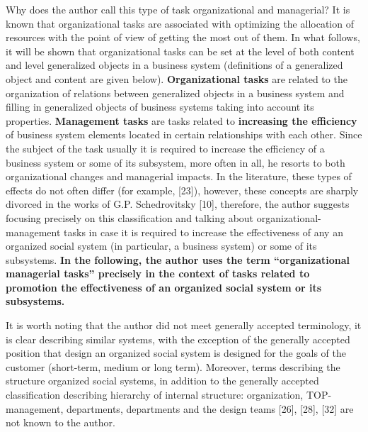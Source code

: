 Why does the author call this type of task organizational and managerial?  It
is known that organizational tasks are associated with optimizing the
allocation of resources with the point of view of getting the most out of
them. In what follows, it will be shown that organizational tasks can be set
at the level of both content and level generalized objects in a business
system (definitions of a generalized object and content are given below).
\textbf{Organizational tasks} are related to the organization of relations
between generalized objects in a business system and filling in generalized
objects of business systems taking into account its properties.
\textbf{Management tasks} are tasks related to \textbf{increasing the
  efficiency} of business system elements located in certain relationships
with each other.  Since the subject of the task usually it is required to
increase the efficiency of a business system or some of its subsystem, more
often in all, he resorts to both organizational changes and managerial
impacts. In the literature, these types of effects do not often differ (for
example, [23]), however, these concepts are sharply divorced in the works of
G.P. Schedrovitsky [10], therefore, the author suggests focusing precisely on
this classification and talking about organizational-management tasks in case
it is required to increase the effectiveness of any an organized social system
(in particular, a business system) or some of its subsystems. \textbf{In the
  following, the author uses the term “organizational managerial tasks”
  precisely in the context of tasks related to promotion the effectiveness of
  an organized social system or its subsystems.}

It is worth noting that the author did not meet generally accepted
terminology, it is clear describing similar systems, with the exception of the
generally accepted position that design an organized social system is designed
for the goals of the customer (short-term, medium or long term). Moreover,
terms describing the structure organized social systems, in addition to the
generally accepted classification describing hierarchy of internal structure:
organization, TOP-management, departments, departments and the design teams
[26], [28], [32] are not known to the author.

